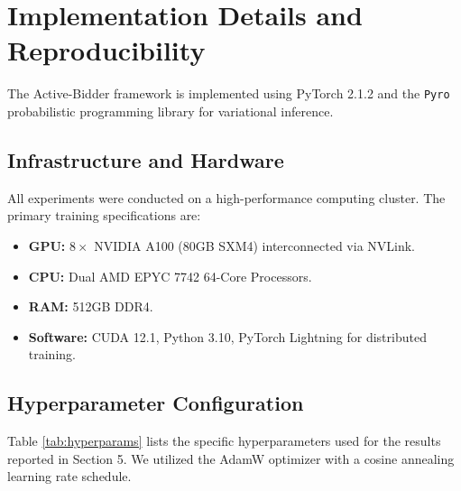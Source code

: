 \section{Implementation Details and Reproducibility}
\label{appendix:implementation}

The Active-Bidder framework is implemented using PyTorch 2.1.2 and the \texttt{Pyro} probabilistic programming library for variational inference.

\subsection{Infrastructure and Hardware}
All experiments were conducted on a high-performance computing cluster. The primary training specifications are:
\begin{itemize}
    \item \textbf{GPU:} $8 \times$ NVIDIA A100 (80GB SXM4) interconnected via NVLink.
    \item \textbf{CPU:} Dual AMD EPYC 7742 64-Core Processors.
    \item \textbf{RAM:} 512GB DDR4.
    \item \textbf{Software:} CUDA 12.1, Python 3.10, PyTorch Lightning for distributed training.
\end{itemize}

\subsection{Hyperparameter Configuration}
Table \ref{tab:hyperparams} lists the specific hyperparameters used for the results reported in Section 5. We utilized the AdamW optimizer \cite{loshchilov2017decoupled} with a cosine annealing learning rate schedule.

\begin{table}[h]
\centering
\caption{Hyperparameter settings for Active-Bidder training.}
\label{tab:hyperparams}
%
\end{table}

